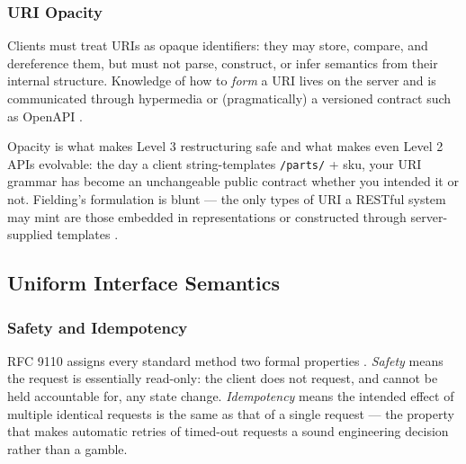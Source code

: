 \subsubsection{URI Opacity}

\begin{definition}
Clients must treat URIs as opaque identifiers: they may store, compare, and
dereference them, but must not parse, construct, or infer semantics from their
internal structure. Knowledge of how to \emph{form} a URI lives on the server and
is communicated through hypermedia or (pragmatically) a versioned contract such
as OpenAPI \cite{openapi31}.
\end{definition}

Opacity is what makes Level 3 restructuring safe and what makes even Level 2 APIs
evolvable: the day a client string-templates \texttt{/parts/} + sku, your URI
grammar has become an unchangeable public contract whether you intended it or
not. Fielding's formulation is blunt --- the only types of URI a RESTful system
may mint are those embedded in representations or constructed through
server-supplied templates \cite{fielding2000rest}.

\subsection{Uniform Interface Semantics}
\label{sec:ch3-uniform}

\subsubsection{Safety and Idempotency}

RFC 9110 assigns every standard method two formal properties
\cite{rfc9110}. \emph{Safety} means the request is essentially read-only: the
client does not request, and cannot be held accountable for, any state change.
\emph{Idempotency} means the intended effect of multiple identical requests is
the same as that of a single request --- the property that makes automatic
retries of timed-out requests a sound engineering decision rather than a gamble.

